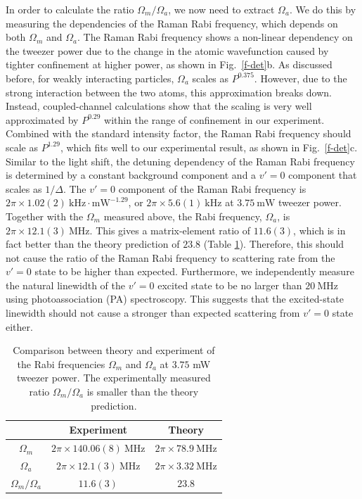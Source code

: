\documentclass[aps,prl,twocolumn,10pt,superscriptaddress]{revtex4-1}
\begin{document}
In order to calculate the ratio $\Omega_m/\Omega_a$,
we now need to extract $ \Omega_a $.
We do this by measuring the dependencies of the Raman Rabi frequency,
which depends on both $\Omega_m$ and $\Omega_a$.
The Raman Rabi frequency shows a non-linear dependency on the tweezer power
due to the change in the atomic wavefunction caused by
tighter confinement at higher power, as shown in Fig.~\ref{f-det}b.
As discussed before, for weakly interacting particles,
$\Omega_a$ scales as $P^{0.375}$.
However, due to the strong interaction between the two atoms, this approximation breaks down.
Instead, coupled-channel calculations show that the scaling
is very well approximated by $P^{0.29}$ within the range of confinement in our experiment.
Combined with the standard intensity factor, the Raman Rabi frequency should scale as $P^{1.29}$,
which fits well to our experimental result, as shown in Fig.~\ref{f-det}c.
Similar to the light shift, the detuning dependency of the Raman Rabi frequency
is determined by a constant background component and
a $v'=0$ component that scales as $1/\Delta$.
The $v'=0$ component of the Raman Rabi frequency is
$2\pi\times1.02(2)~\mathrm{kHz\cdot mW^{-1.29}}$,
or $2\pi \times 5.6(1)~\mathrm{kHz}$ at $3.75~\mathrm{mW}$ tweezer power.
Together with the $\Omega_m$ measured above, the Rabi frequency, $ \Omega_a $, is
$2\pi \times 12.1(3)~\mathrm{MHz}$.
This gives a matrix-element ratio of $11.6(3)$,
which is in fact better than the theory prediction of $23.8$ (Table \ref{tab:rabi_freqs}).
Therefore, this should not cause the ratio of the Raman Rabi frequency to scattering rate
from the $v'=0$ state to be higher than expected.
Furthermore, we independently measure the natural linewidth of the $v'=0$ excited state to be no larger than $20~\mathrm{MHz}$ using photoassociation (PA) spectroscopy.
This suggests that the excited-state linewidth should not cause
a stronger than expected scattering from $v'=0$ state either.

\begin{table}[ht]
  \centering
  \begin{tabular}{c|c|c}
    & Experiment & Theory \\ \hline
    $ \Omega_m $ & $2\pi \times 140.06(8) ~\mathrm{MHz} $ & $2\pi \times 78.9 ~\mathrm{MHz}$ \\
    $\Omega_a$ & $2\pi \times 12.1(3) ~\mathrm{MHz}$ & $2\pi \times 3.32 ~\mathrm{MHz}$ \\
    $\Omega_m/\Omega_a$ & $11.6(3)$ & $ 23.8$
  \end{tabular}
  \caption{Comparison between theory and experiment of the Rabi frequencies $\Omega_m$ and $\Omega_a$ at $3.75$ mW tweezer power. The experimentally measured ratio $\Omega_m/\Omega_a$ is smaller than the theory prediction.}
  \label{tab:rabi_freqs}
\end{table}
\end{document}
